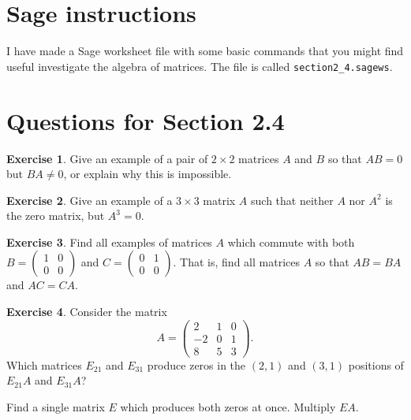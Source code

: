 \documentclass[11pt]{amsart}
\theoremstyle{definition}
\newtheorem{exercise}{Exercise}
\begin{document}
\section{Sage instructions}

I have made a Sage worksheet file with some basic commands that you might find useful investigate the algebra of  matrices. The file is called \texttt{section2\_4.sagews}.


\section{Questions for Section 2.4}
\setcounter{exercise}{52}

\begin{exercise}
Give an example of a pair of $2\times 2$ matrices $A$ and $B$ so that $AB = 0$ but $BA\neq 0$, or explain why this is  impossible.
\end{exercise}

\begin{exercise}
Give an example of a $3\times 3$ matrix $A$ such that neither $A$ nor $A^2$ is the zero matrix, but $A^3=0$.
\end{exercise}

\begin{exercise}
Find all examples of matrices $A$ which commute with both $B = \left( \begin{smallmatrix} 1 & 0 \\ 0 & 0 \end{smallmatrix}\right)$ and $C = \left( \begin{smallmatrix} 0 & 1 \\ 0 & 0 \end{smallmatrix}\right)$. That is, find all matrices $A$ so that $AB = BA$ and $AC= CA$.
\end{exercise}

\begin{exercise}
Consider the matrix
\[
A = \begin{pmatrix} 2 & 1 & 0 \\ -2 & 0 & 1 \\ 8 & 5 & 3 \end{pmatrix}.
\]
Which matrices $E_{21}$ and $E_{31}$ produce zeros in the $(2,1)$ and $(3,1)$ positions of $E_{21}A$ and $E_{31}A$?

Find a single matrix $E$ which produces both zeros at once. Multiply $EA$.
\end{exercise}
\end{document}
